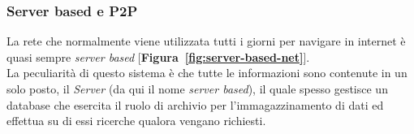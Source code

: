 \documentclass[11pt]{thesistemp}
\begin{document}
\subsubsection{Server based e P2P}
La rete che normalmente viene utilizzata tutti i giorni per navigare in internet è quasi sempre \textit{server based} [\textbf{Figura~\ref{fig:server-based-net}}].\\
La peculiarità di questo sistema è che tutte le informazioni sono contenute in un solo posto, il \textit{Server} (da qui il nome \textit{server based}), il quale spesso gestisce un database che esercita il ruolo di archivio per l'immagazzinamento di dati ed effettua su di essi ricerche qualora vengano richiesti.
\end{document}
